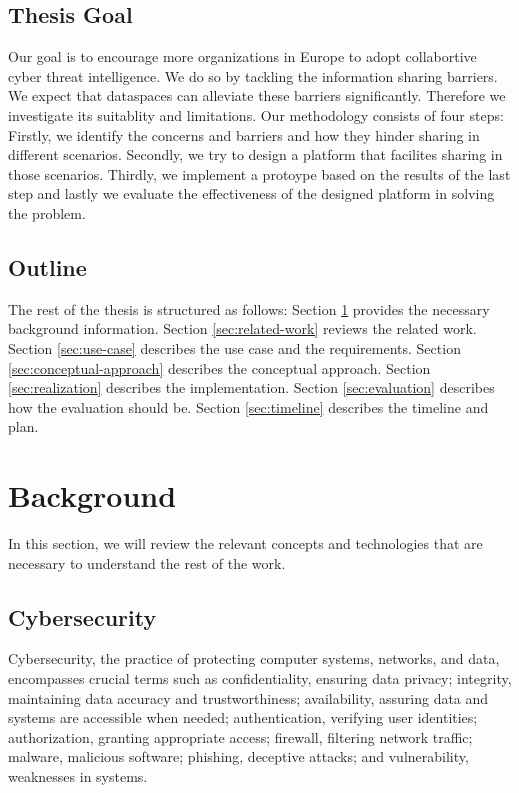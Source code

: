 \documentclass{article}
\begin{document}
\subsection{Thesis Goal}


% 

Our goal is to encourage more organizations in Europe to adopt collabortive cyber threat intelligence. We do so by tackling the information sharing barriers. We expect that dataspaces can alleviate these barriers significantly. Therefore we investigate its suitablity and limitations. Our methodology consists of four steps: Firstly, we identify the concerns and barriers and how they hinder sharing in different scenarios. Secondly, we try to design a platform that facilites sharing in those scenarios. Thirdly, we implement a protoype based on the results of the last step and lastly we evaluate the effectiveness of the designed platform in solving the problem.

\subsection{Outline}

The rest of the thesis is structured as follows: Section \ref{sec:background} provides the necessary background information. Section \ref{sec:related-work} reviews the related work. Section \ref{sec:use-case} describes the use case and the requirements. Section \ref{sec:conceptual-approach} describes the conceptual approach. Section \ref{sec:realization} describes the implementation. Section \ref{sec:evaluation} describes how the evaluation should be. Section \ref{sec:timeline} describes the timeline and plan.

\section{Background} %
\label{sec:background}
In this section, we will review the relevant concepts and technologies that are necessary to understand the rest of the work.

\subsection{Cybersecurity}

Cybersecurity, the practice of protecting computer systems, networks, and data, encompasses crucial terms such as confidentiality, ensuring data privacy; integrity, maintaining data accuracy and trustworthiness; availability, assuring data and systems are accessible when needed; authentication, verifying user identities; authorization, granting appropriate access; firewall, filtering network traffic; malware, malicious software; phishing, deceptive attacks; and vulnerability, weaknesses in systems.
\end{document}
